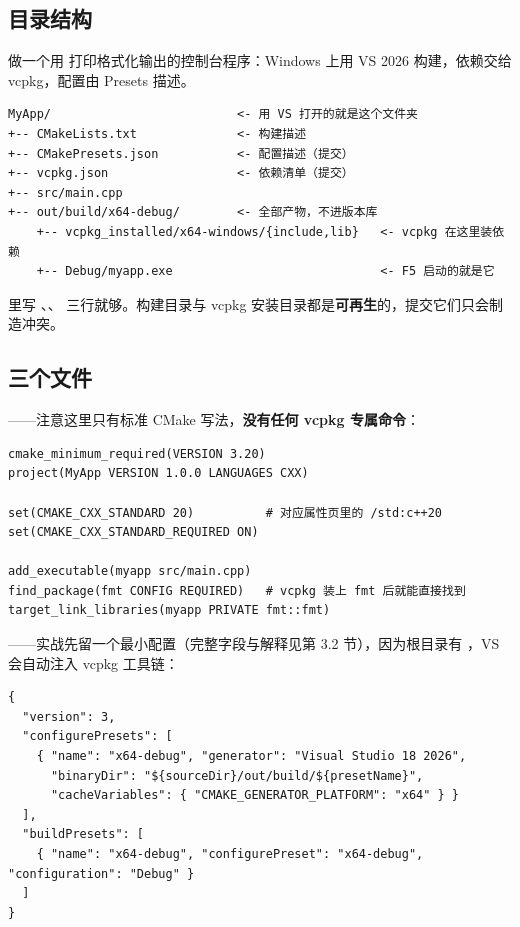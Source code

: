 \subsection{目录结构}
做一个用  打印格式化输出的控制台程序：Windows 上用 VS 2026 构建，依赖交给 vcpkg，配置由 Presets 描述。

\begin{lstlisting}[style=textstyle]
MyApp/                          <- 用 VS 打开的就是这个文件夹
+-- CMakeLists.txt              <- 构建描述
+-- CMakePresets.json           <- 配置描述（提交）
+-- vcpkg.json                  <- 依赖清单（提交）
+-- src/main.cpp
+-- out/build/x64-debug/        <- 全部产物，不进版本库
    +-- vcpkg_installed/x64-windows/{include,lib}   <- vcpkg 在这里装依赖
    +-- Debug/myapp.exe                             <- F5 启动的就是它
\end{lstlisting}

\begin{tipbox}[提示]
 里写 、、 三行就够。构建目录与 vcpkg 安装目录都是\textbf{可再生}的，提交它们只会制造冲突。
\end{tipbox}

\subsection{三个文件}
——注意这里只有标准 CMake 写法，\textbf{没有任何 vcpkg 专属命令}：

\begin{lstlisting}[style=cmakestyle]
cmake_minimum_required(VERSION 3.20)
project(MyApp VERSION 1.0.0 LANGUAGES CXX)

set(CMAKE_CXX_STANDARD 20)          # 对应属性页里的 /std:c++20
set(CMAKE_CXX_STANDARD_REQUIRED ON)

add_executable(myapp src/main.cpp)
find_package(fmt CONFIG REQUIRED)   # vcpkg 装上 fmt 后就能直接找到
target_link_libraries(myapp PRIVATE fmt::fmt)
\end{lstlisting}

——实战先留一个最小配置（完整字段与解释见第 3.2 节），因为根目录有 ，VS 会自动注入 vcpkg 工具链：

\begin{lstlisting}[style=jsonstyle]
{
  "version": 3,
  "configurePresets": [
    { "name": "x64-debug", "generator": "Visual Studio 18 2026",
      "binaryDir": "${sourceDir}/out/build/${presetName}",
      "cacheVariables": { "CMAKE_GENERATOR_PLATFORM": "x64" } }
  ],
  "buildPresets": [
    { "name": "x64-debug", "configurePreset": "x64-debug", "configuration": "Debug" }
  ]
}
\end{lstlisting}

